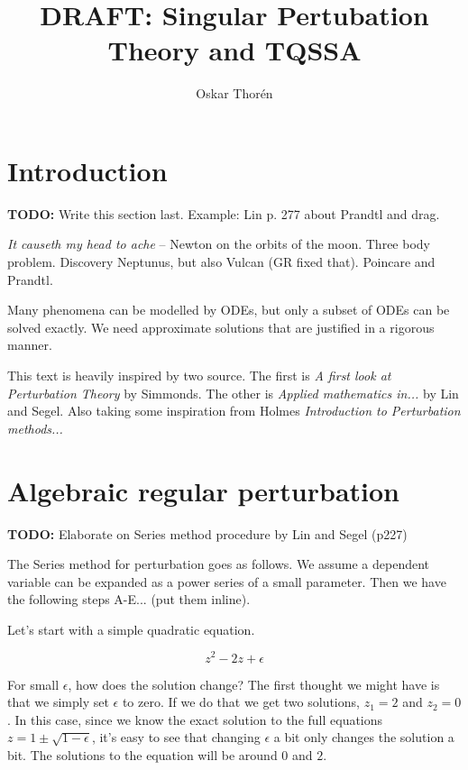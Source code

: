 \documentclass[12pt]{report}
\begin{document}


\title{DRAFT: Singular Pertubation Theory and TQSSA}
\author{Oskar Thor\'{e}n}

\maketitle

\tableofcontents

\chapter{Introduction}

\textbf{TODO:} Write this section last. Example: Lin p. 277 about Prandtl and drag.

\textit{It causeth my head to ache} -- Newton on the orbits of the moon. Three
body problem. Discovery Neptunus, but also Vulcan (GR fixed that). Poincare and Prandtl.

Many phenomena can be modelled by ODEs, but only a subset of ODEs can be solved
exactly. We need approximate solutions that are justified in a rigorous manner.

This text is heavily inspired by two source. The first is
\textit{A first look at Perturbation Theory} by Simmonds. The other is
\textit{Applied mathematics in...} by Lin and Segel. Also taking some
inspiration from Holmes \textit{Introduction to Perturbation methods...}

\chapter{Algebraic regular perturbation}

\textbf{TODO:} Elaborate on Series method procedure by Lin and Segel (p227)

The Series method for perturbation goes as follows. We assume a dependent variable can be expanded as a power series of a small parameter. Then we have the following steps A-E... (put them inline).

Let's start with a simple quadratic equation.

\begin{equation}
  z^2 - 2z + \epsilon
\end{equation}

For small $\epsilon$, how does the solution change? The first thought
we might have is that we simply set $\epsilon$ to zero. If we do that
we get two solutions, $z_1 = 2$ and $z_2 = 0$. In this case, since we
know the exact solution to the full equations $z = 1 \pm
\sqrt{1-\epsilon}$, it's easy to see that changing $\epsilon$ a bit
only changes the solution a bit. The solutions to the equation will be
around $0$ and $2$.
\end{document}

